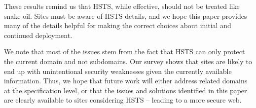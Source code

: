 \documentclass{acm_proc_article-sp}
\begin{document}
These results remind us that HSTS, while effective, should not be treated like snake oil. Sites must be aware of HSTS details, and we hope this paper provides many of the details helpful for making the correct choices about initial and continued deployment.

We note that most of the issues stem from the fact that HSTS can only protect the current domain and not subdomains. Our survey shows that sites are likely to end up with unintentional security weaknesses given the currently available information. Thus, we hope that future work will either address related domains at the specification level, or that the issues and solutions identified in this paper are clearly available to sites considering HSTS -- leading to a more secure web.




\end{document}
